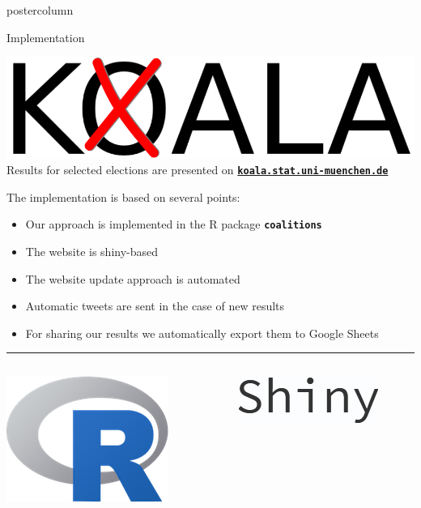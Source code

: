 \documentclass[final,hyperref={pdfpagelabels=false}]{beamer}
\newcommand{\bfBlue}[1]{\textcolor{koaladarkestblue}{\textbf{#1}}}
\newcommand*\circled[1]{\tikz[baseline=(char.base)]{
\node[shape=circle,draw,inner sep=2pt] (char) {#1};}}
\begin{document}
\begin{frame}
\begin{columns}
\begin{column}{1\textwidth}
\begin{columns}[T]
\begin{column}{.484\textwidth}
\begin{beamercolorbox}[center,wd=\textwidth]{postercolumn}
\begin{minipage}[T]{.95\textwidth}
\begin{block}{\footnotesize \circled{3} Implementation}
\begin{center}
\includegraphics[height=5ex]{figures/Koala_Logo_ohneSchrift}
\\[2ex]
Results for selected elections are presented on
\bfBlue{\texttt{\href{http://koala.stat.uni-muenchen.de}{koala.stat.uni-muenchen.de}}}
\end{center}
\vspace{2ex}
The implementation is based on several points:
\begin{itemize}
  \item Our approach is implemented in the R package \bfBlue{\texttt{coalitions}} 
  \item The website is shiny-based
  \item The website update approach is automated
  \item Automatic tweets are sent in the case of new results
  \item For sharing our results we automatically export them to Google Sheets
\end{itemize}

\vspace{1ex}
\textcolor{LMUlightgray}{\hrule{}}
\vspace{1ex}
\begin{columns}[t]
  \begin{column}{.15\textwidth}
  \begin{center}
  \includegraphics[height=5ex]{figures/implementation_r}
  \end{center}
  \end{column}

  \hspace{-1.5ex}
  \textcolor{LMUlightgray}{\vrule{}}
  \hspace{1.5ex}

  \begin{column}{.15\textwidth}
  \begin{center}
  \vspace{1ex}
  \includegraphics[height=3ex]{figures/implementation_shiny}
  \end{center}
  \end{column}


\end{columns}
\end{block}
\end{minipage}
\end{beamercolorbox}
\end{column}
\end{columns}
\end{column}
\end{columns}
\end{frame}
\end{document}
